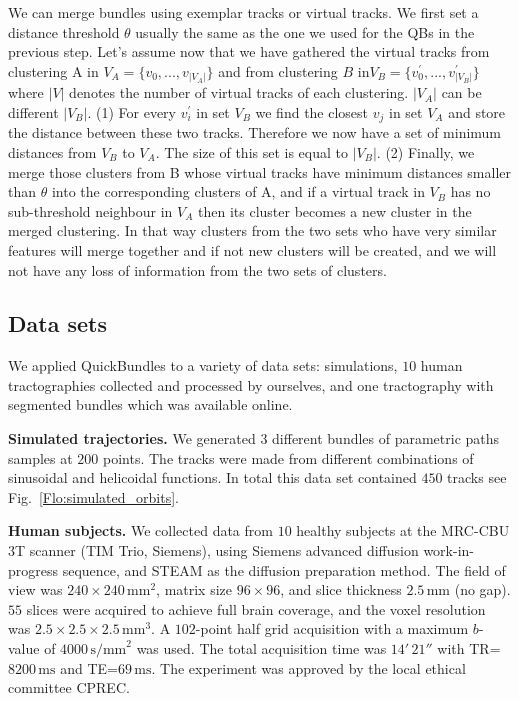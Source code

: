 \documentclass[preprint,authoryear,a4paper,10pt,onecolumn]{elsarticle}
\begin{document}
We can merge bundles using exemplar tracks or virtual tracks. We first
set a distance threshold $\theta$ usually the same as the one we used
for the QBs in the previous step. Let's assume now that we have gathered
the virtual tracks from clustering A in
$V_{A}=\{v_{0},...,v_{|V_{A}|}\}$ and from clustering $B$
in$V_{B}=\{v_{0}^{'},...,v_{|V_{B}|}^{'}\}$ where $|V|$ denotes the
number of virtual tracks of each clustering.  $|V_{A}|$ can be different
$|V_{B}|$. (1) For every $v_{i}^{'}$ in set $V_{B}$ we find the closest
$v_{j}$ in set $V_{A}$ and store the distance between these two
tracks. Therefore we now have a set of minimum distances from $V_{B}$ to
$V_{A}$. The size of this set is equal to $|V_{B}|$. (2) Finally, we
merge those clusters from B whose virtual tracks have minimum
distances smaller than $\theta$ into the corresponding clusters of A,
and if a virtual track in $V_{B}$ has no sub-threshold neighbour in
$V_{A}$ then its cluster becomes a new cluster in the merged
clustering. In that way clusters from the two sets who have very similar
features will merge together and if not new clusters will be created,
and we will not have any loss of information from the two sets of
clusters.

\subsection{\label{sub:QB-Data-sets}Data sets}

We applied QuickBundles to a variety of data sets: simulations, $10$ human
tractographies collected and processed by ourselves, and one tractography
with segmented bundles which was available online.

\textbf{Simulated trajectories.} We generated $3$ different bundles of
parametric paths samples at $200$ points. The tracks were made from
different combinations of sinusoidal and helicoidal functions.  In total
this data set contained $450$ tracks see Fig.~\ref{Flo:simulated_orbits}.

\textbf{Human subjects.} We collected data from $10$ healthy subjects at
the MRC-CBU 3T scanner (TIM Trio, Siemens), using Siemens advanced
diffusion work-in-progress sequence, and STEAM
\citep{merboldt1992diffusion,MAB04} as the diffusion preparation
method. The field of view was $240\times240\,\textrm{mm}^{2}$, matrix size
$96\times96$, and slice thickness $2.5\,\textrm{mm}$ (no gap).  $55$ slices were
acquired to achieve full brain coverage, and the voxel resolution was
$2.5\times2.5\times2.5\,\textrm{mm}^{3}$. A $102$-point half grid
acquisition \citep{Yeh2010} with a maximum $b$-value of $4000\, \textrm{s/mm}^{2}$
was used. The total acquisition time was $14'\,21''$ with
TR=$8200\,\textrm{ms}$ and TE=$69\,\textrm{ms}$. The experiment was approved
by the local ethical committee CPREC.
\end{document}
